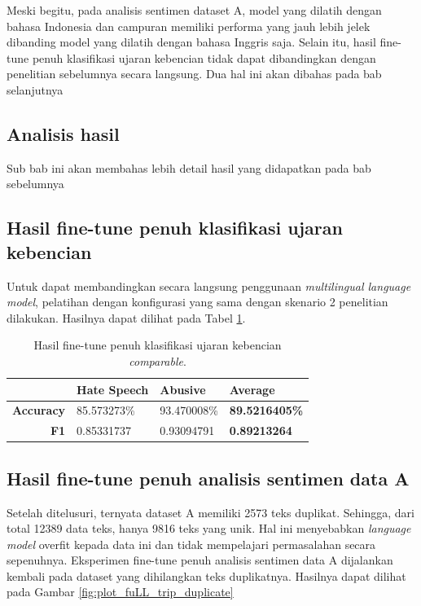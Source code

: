         Meski begitu, pada analisis sentimen dataset A, model yang dilatih dengan bahasa Indonesia dan campuran memiliki performa yang jauh lebih jelek dibanding model yang dilatih dengan bahasa Inggris saja. Selain itu, hasil fine-tune penuh klasifikasi ujaran kebencian tidak dapat dibandingkan dengan penelitian sebelumnya secara langsung. Dua hal ini akan dibahas pada bab selanjutnya

\subsection{Analisis hasil}
    Sub bab ini akan membahas lebih detail hasil yang didapatkan pada bab sebelumnya

    \subsection{Hasil fine-tune penuh klasifikasi ujaran kebencian}
    Untuk dapat membandingkan secara langsung penggunaan \textit{multilingual language model}, pelatihan dengan konfigurasi yang sama dengan skenario 2 penelitian \parencite{Ibrohim_Budi_2019} dilakukan. Hasilnya dapat dilihat pada Tabel \ref{tab:toxic_xlm_r_comparable}.

    \begin{table}[]
        \centering
        \begin{tabular}{|r|l|l|l|}
        \hline
        \multicolumn{1}{|l|}{} & \textbf{Hate Speech} & \textbf{Abusive} & \textbf{Average}      \\ \hline
        \textbf{Accuracy}      & 85.573273\%          & 93.470008\%      & \textbf{89.5216405\%} \\ \hline
        \textbf{F1}            & 0.85331737           & 0.93094791       & \textbf{0.89213264}   \\ \hline
        \end{tabular}
        \caption{Hasil fine-tune penuh klasifikasi ujaran kebencian \textit{comparable}.}
        \label{tab:toxic_xlm_r_comparable}
    \end{table}

    \subsection{Hasil fine-tune penuh analisis sentimen data A}
    Setelah ditelusuri, ternyata dataset A memiliki 2573 teks duplikat. Sehingga, dari total 12389 data teks, hanya 9816 teks yang unik. Hal ini menyebabkan \textit{language model} overfit kepada data ini dan tidak mempelajari permasalahan secara sepenuhnya. Eksperimen fine-tune penuh analisis sentimen data A dijalankan kembali pada dataset yang dihilangkan teks duplikatnya. Hasilnya dapat dilihat pada Gambar \ref{fig:plot_fuLL_trip_duplicate}

    



    
        

